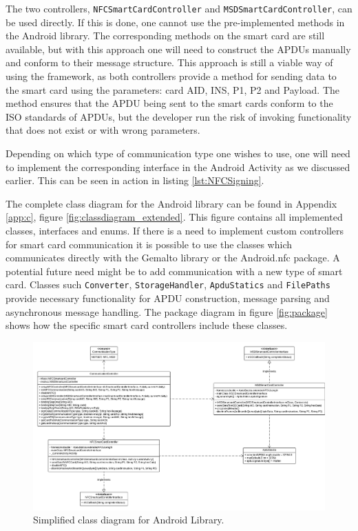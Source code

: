 The two controllers, \texttt{NFCSmartCardController} and \texttt{MSDSmartCardController}, can be used directly. If this is done, one cannot use the pre-implemented methods in the Android library. The corresponding methods on the smart card are still available, but with this approach one will need to construct the APDUs manually and conform to their message structure. This approach is still a viable way of using the framework, as both controllers provide a method for sending data to the smart card using the parameters: card AID, INS, P1, P2 and Payload. The method ensures that the APDU being sent to the smart cards conform to the ISO standards of APDUs, but the developer run the risk of invoking functionality that does not exist or with wrong parameters.

Depending on which type of communication type one wishes to use, one will need to implement the corresponding interface in the Android Activity as we discussed earlier. This can be seen in action in listing \ref{lst:NFCSigning}.

The complete class diagram for the Android library can be found in Appendix \ref{app:c}, figure \ref{fig:classdiagram_extended}. This figure contains all implemented classes, interfaces and enums. If there is a need to implement custom controllers for smart card communication it is possible to use the classes which communicates directly with the Gemalto library or the Android.nfc package. A potential future need might be to add communication with a new type of smart card. Classes such \texttt{Converter}, \texttt{StorageHandler}, \texttt{ApduStatics} and \texttt{FilePaths} provide necessary functionality for APDU construction, message parsing and asynchronous message handling. The package diagram in figure \ref{fig:package} shows how the specific smart card controllers include these classes. %

\begin{figure}[h!]
  \caption{Simplified class diagram for Android Library.}
  \label{fig:classdiagram_simple}
  \centering
    \includegraphics[width=1.25\textwidth, angle =90]{images/Class_Diagram.png}
\end{figure}
\clearpage

